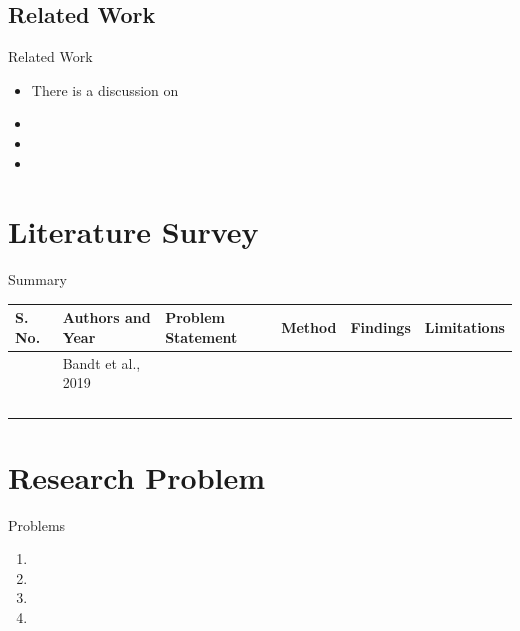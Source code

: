 \documentclass[11pt]{beamer}
\begin{document}
\subsection{Related Work}
    \begin{frame}{ Related Work}
\begin{itemize}
\item There is a discussion on
\item 
\item 
\item 
\end{itemize}
\end{frame}


\section{Literature Survey}
\begin{frame}{Summary}
       \begin{center}

\scriptsize \begin{tabular}{|p{0.4cm}|p{1.0cm}|p{1.7cm}|p{1.2cm}|p{1.7cm}|p{2cm}|}
 \hline
 \textbf{S. No.} & \textbf{Authors and Year} & \textbf{Problem Statement} & \textbf{Method} & \textbf{Findings} & \textbf{Limitations}\\ 
 \hline
 \cite{1}  & Bandt et al., 2019 &  &  &  & \\
 \hline
 \cite{2} &  &  &  &  & \\
 \hline
 \cite{3} &  &  &  &  & \\
 \hline
 \cite{4} &  &  &  &  & \\
 \hline
 \cite{5} &  &  &  &  & \\
 \hline

\end{tabular}
\end{center}

\end{frame}

\section{Research Problem}
\begin{frame}{Problems}
    \begin{enumerate}
        \item  
        \item 
        \item 
        \item
    \end{enumerate}
\end{frame}
\end{document}
